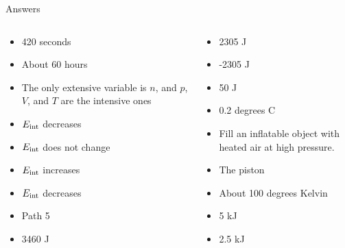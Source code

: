\documentclass{beamer}
\begin{document}
\begin{frame}{Answers}
\small
\begin{columns}[T]
\begin{column}{0.5\textwidth}
\begin{itemize}
\item 420 seconds
\item About 60 hours
\item The only extensive variable is $n$, and $p$, $V$, and $T$ are the intensive ones
\item $E_{\rm int}$ decreases
\item $E_{\rm int}$ does not change
\item $E_{\rm int}$ increases
\item $E_{\rm int}$ decreases
\item Path 5
\item 3460 J
\end{itemize}
\end{column}
\begin{column}{0.5\textwidth}
\begin{itemize}
\item 2305 J
\item -2305 J
\item 50 J
\item 0.2 degrees C
\item Fill an inflatable object with heated air at high pressure.
\item The piston
\item About 100 degrees Kelvin
\item 5 kJ
\item 2.5 kJ
\end{itemize}
\end{column}
\end{columns}
\end{frame}
\end{document}
